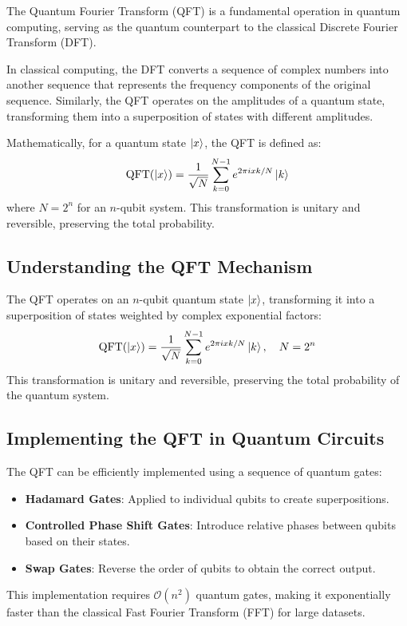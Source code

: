 \documentclass{article}
\begin{document}
The Quantum Fourier Transform (QFT) is a fundamental operation in quantum computing, serving as the quantum counterpart to the classical Discrete Fourier Transform (DFT).

In classical computing, the DFT converts a sequence of complex numbers into another sequence that represents the frequency components of the original sequence. Similarly, the QFT operates on the amplitudes of a quantum state, transforming them into a superposition of states with different amplitudes.

Mathematically, for a quantum state $\ket{x}$, the QFT is defined as:
\[
    \text{QFT}(\ket{x}) = \frac{1}{\sqrt{N}} \sum_{k=0}^{N-1} e^{2\pi i xk / N} \ket{k}
\]
where $N = 2^n$ for an $n$-qubit system. This transformation is unitary and reversible, preserving the total probability.

\subsection{Understanding the QFT Mechanism}

The QFT operates on an $n$-qubit quantum state $\ket{x}$, transforming it into a superposition of states weighted by complex exponential factors:
\[
    \text{QFT}(\ket{x}) = \frac{1}{\sqrt{N}} \sum_{k=0}^{N-1} e^{2\pi i xk / N} \ket{k}, \quad N = 2^n
\]
This transformation is unitary and reversible, preserving the total probability of the quantum system.

\subsection{Implementing the QFT in Quantum Circuits}

The QFT can be efficiently implemented using a sequence of quantum gates:
\begin{itemize}
    \item \textbf{Hadamard Gates}: Applied to individual qubits to create superpositions.
    \item \textbf{Controlled Phase Shift Gates}: Introduce relative phases between qubits based on their states.
    \item \textbf{Swap Gates}: Reverse the order of qubits to obtain the correct output.
\end{itemize}

This implementation requires $\mathcal{O}(n^2)$ quantum gates, making it exponentially faster than the classical Fast Fourier Transform (FFT) for large datasets.
\end{document}

